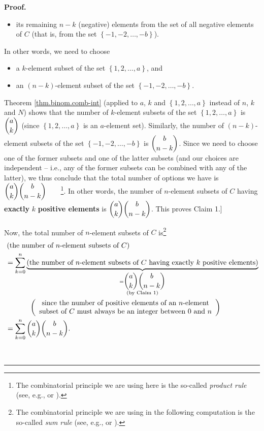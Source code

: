 \documentclass[numbers=enddot,12pt,final,onecolumn,notitlepage]{scrartcl}%
\numberwithin{exer}{subsection}
\theoremstyle{definition}
\newenvironment{proof}[1][Proof]{\noindent\textbf{#1.} }{\ \rule{0.5em}{0.5em}}
\let\sumnonlimits\sum
\renewcommand{\sum}{\sumnonlimits\limits}
\begin{document}
\begin{proof}
\begin{itemize}
\begin{itemize}
\item its remaining $n-k$ (negative) elements from the set of all negative
elements of $C$ (that is, from the set $\left\{  -1,-2,\ldots,-b\right\}  $).
\end{itemize}

In other words, we need to choose

\begin{itemize}
\item a $k$-element subset of the set $\left\{  1,2,\ldots,a\right\}  $, and

\item an $\left(  n-k\right)  $-element subset of the set $\left\{
-1,-2,\ldots,-b\right\}  $.
\end{itemize}

Theorem \ref{thm.binom.comb-int} (applied to $a$, $k$ and $\left\{
1,2,\ldots,a\right\}  $ instead of $n$, $k$ and $N$) shows that the number of
$k$-element subsets of the set $\left\{  1,2,\ldots,a\right\}  $ is
$\dbinom{a}{k}$ (since $\left\{  1,2,\ldots,a\right\}  $ is an $a$-element
set). Similarly, the number of $\left(  n-k\right)  $-element subsets of the
set $\left\{  -1,-2,\ldots,-b\right\}  $ is $\dbinom{b}{n-k}$. Since we need
to choose one of the former subsets and one of the latter subsets (and our
choices are independent -- i.e., any of the former subsets can be combined
with any of the latter), we thus conclude that the total number of options we
have is $\dbinom{a}{k}\dbinom{b}{n-k}$\ \ \ \ \footnote{The combinatorial
principle we are using here is the so-called \textit{product rule} (see, e.g.,
\cite[1.8]{Loehr-BC} or \cite[\S 15.2.1]{LeLeMe}).}. In other words, the
number of $n$-element subsets of $C$ having \textbf{exactly }$k$
\textbf{positive elements} is $\dbinom{a}{k}\dbinom{b}{n-k}$. This proves
Claim 1.]

Now, the total number of $n$-element subsets of $C$ is\footnote{The
combinatorial principle we are using in the following computation is the
so-called \textit{sum rule} (see, e.g., \cite[1.2]{Loehr-BC} or
\cite[\S 15.2.3]{LeLeMe}).}%
\begin{align*}
&  \left(  \text{the number of }n\text{-element subsets of }C\right) \\
&  =\sum_{k=0}^{n}\underbrace{\left(  \text{the number of }n\text{-element
subsets of }C\text{ having exactly }k\text{ positive elements}\right)
}_{\substack{=\dbinom{a}{k}\dbinom{b}{n-k}\\\text{(by Claim 1)}}}\\
&  \ \ \ \ \ \ \ \ \ \ \left(
\begin{array}
[c]{c}%
\text{since the number of positive elements of an }n\text{-element}\\
\text{subset of }C\text{ must always be an integer between }0\text{ and }n
\end{array}
\right) \\
&  =\sum_{k=0}^{n}\dbinom{a}{k}\dbinom{b}{n-k}.
\end{align*}


\end{itemize}
\end{proof}
\end{document}
